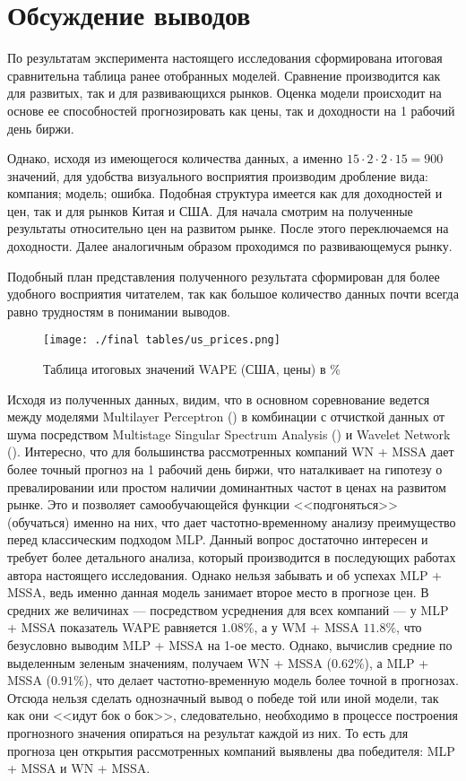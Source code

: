 \section{Обсуждение выводов}
По результатам эксперимента настоящего исследования сформирована итоговая сравнительна таблица ранее отобранных моделей. Сравнение производится как для развитых, так и для развивающихся рынков. Оценка модели происходит на основе ее способностей прогнозировать как цены, так и доходности на 1 рабочий день биржи.

Однако, исходя из имеющегося количества данных, а именно $15 \cdot 2 \cdot  2 \cdot 15 = 900$ значений, для удобства визуального восприятия производим дробление вида: компания; модель; ошибка. Подобная структура имеется как для доходностей и цен, так и для рынков Китая и США. Для начала смотрим на полученные результаты относительно цен на развитом рынке. После этого переключаемся на доходности. Далее аналогичным образом проходимся по развивающемуся рынку.

Подобный план представления полученного результата сформирован для более удобного восприятия читателем, так как большое количество данных почти всегда равно трудностям в понимании выводов.

\begin{figure}[H]
	\centering
	\texttt{[image: ./final tables/us\_prices.png]}
	\caption{Таблица итоговых значений WAPE (США, цены) в \%}
	\label{pic::final_table_us_prices}
\end{figure}

\noindent Исходя из полученных данных, видим, что в основном соревнование ведется между моделями Multilayer Perceptron () в комбинации с отчисткой данных от шума посредством Multistage Singular Spectrum Analysis () и Wavelet Network (). Интересно, что для большинства рассмотренных компаний WN + MSSA дает более точный прогноз на 1 рабочий день биржи, что наталкивает на гипотезу о превалировании или простом наличии доминантных частот в ценах на развитом рынке. Это и позволяет самообучающейся функции <<подгоняться>> (обучаться) именно на них, что дает частотно-временному анализу преимущество перед классическим подходом MLP. Данный вопрос достаточно интересен и требует более детального анализа, который производится в последующих работах автора настоящего исследования. Однако нельзя забывать и об успехах MLP + MSSA, ведь именно данная модель занимает второе место в прогнозе цен. В средних же величинах --- посредством усреднения для всех компаний --- у MLP + MSSA показатель WAPE равняется $1.08\%$, а у WM + MSSA $11.8\%$, что безусловно выводим MLP + MSSA на 1-ое место. Однако, вычислив средние по выделенным зеленым значениям, получаем WN + MSSA ($0.62\%$), а MLP + MSSA ($0.91\%$), что делает частотно-временную модель более точной в прогнозах. Отсюда нельзя сделать однозначный вывод о победе той или иной модели, так как они <<идут бок о бок>>, следовательно, необходимо в процессе построения прогнозного значения опираться на результат каждой из них. То есть для прогноза цен открытия рассмотренных компаний выявлены два победителя: MLP + MSSA и WN + MSSA.

